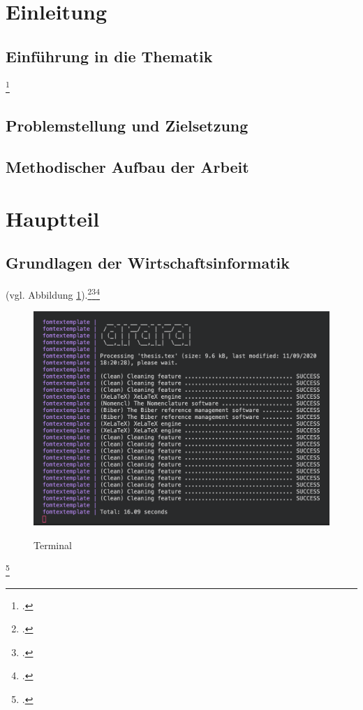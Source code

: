 \section{Einleitung}
\subsection{Einführung in die Thematik}
\blindtext{}
\blindtext\footcite[Vgl. ][]{mswpf}

\subsection{Problemstellung und Zielsetzung}
\blindtext

\subsection{Methodischer Aufbau der Arbeit}
\blindtext

\section{Hauptteil}
\subsection{Grundlagen der Wirtschaftsinformatik}
\blindtext (vgl. Abbildung \ref{abb_bsp}).\footcite[Vgl. ][]{msdatabind}\footcite[Vgl. ][]{Atypisch}\footcite[Vgl. ][34]{Digitaloekonomie}
\blindenumerate
\Blindtext

\begin{figure}[!htb]
    \caption{Terminal}
    \includegraphics[width=1\textwidth]{.github/terminal}
    \captionsetup{width=1\textwidth}
    \label{abb_bsp}
\end{figure}
\blindtext\footcite[Vgl. ][415-426]{Tanenbaum2016}

